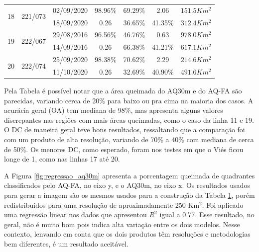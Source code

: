\documentclass[cic,tc]{iiufrgs}
\begin{document}
\begin{table}[!htb]
\begin{tabular}{ccccccl}
\hline
\multirow{2}{*}{18} & \multirow{2}{*}{221/073} & 02/09/2020 & 98.96\% & 69.29\% & 2.06 & $151.5Km^2$ \\
                         &  & 18/09/2020 & 0.26 & 36.65\% & 41.35\% & $312.4Km^2$ \\
\hline
\multirow{2}{*}{19} & \multirow{2}{*}{222/067} & 29/08/2016 & 96.56\% & 46.76\% & 0.63 & $978.0Km^2$ \\
                         &  & 14/09/2016 & 0.26 & 66.38\% & 41.21\% & $617.1Km^2$ \\
\hline
\multirow{2}{*}{20} & \multirow{2}{*}{222/074} & 25/09/2020 & 98.38\% & 70.62\% & 2.29 & $214.6Km^2$ \\
                         &  & 11/10/2020 & 0.26 & 32.69\% & 40.90\% & $491.6Km^2$ \\
\bottomrule
\end{tabular}
\label{table:regioes_validação}
\end{table}

Pela Tabela é possível notar que a área queimada do AQ30m e do AQ-FA são parecidas, variando cerca de 20\% para baixo ou pra cima na maioria dos casos. A acurácia geral (OA) tem mediana de 98\%, mas apresenta alguns valores discrepantes nas regiões com mais áreas queimadas, como o caso da linha 11 e 19. O DC de maneira geral teve bons resultados, ressaltando que a comparação foi com um produto de alta resolução, variando de 70\% a 40\% com mediana de cerca de 50\%. Os menores DC, como esperado, foram nos testes em que o Viés ficou longe de 1, como nas linhas 17 até 20.

A Figura \ref{fig:regressao_aq30m} apresenta a porcentagem queimada de quadrantes classificados pelo AQ-FA, no eixo y, e o AQ30m, no eixo x. Os resultados usados para gerar a imagem são os mesmos usados para a construção da Tabela \ref{table:regioes_validação}, porém redistribuídos para uma resolução de aproximadamente 250 Km$^2$. Foi aplicado uma regressão linear nos dados que apresentou $R^2$ igual a 0.77. Esse resultado, no geral, não é muito bom pois indica alta variação entre os dois modelos. Nesse contexto, lenvando em conta que os dois produtos têm resoluções e metodologias bem diferentes, é um resultado aceitável. 
\end{document}
